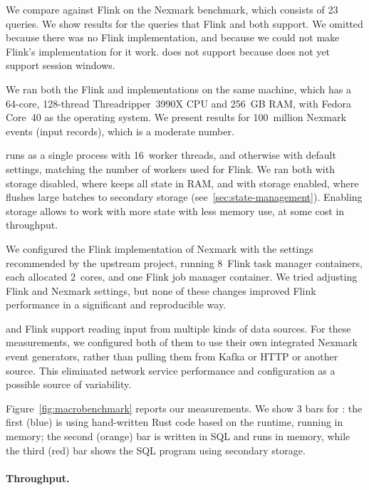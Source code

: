 We compare \dbsp against Flink on the Nexmark benchmark, which
consists of 23 queries.  We show results for the queries that Flink
and \dbsp both support.  We omitted  because there was no
Flink implementation, and  because we could not make
Flink's implementation for it work.  \dbsp does not support
 because \dbsp does not yet support session windows.

We ran both the Flink and \dbsp implementations on the same machine,
which has a 64-core, 128-thread Threadripper~3990X CPU and 256~GB RAM,
with Fedora Core~40 as the operating system. We present results for
100~million Nexmark events (input records), which is a moderate
number.

\dbsp runs as a single process with 16~worker threads, and otherwise
with default settings, matching the number of workers used for Flink.
We ran \dbsp both with storage disabled, where \dbsp keeps all state
in RAM, and with storage enabled, where \dbsp flushes large batches to
secondary storage (see~\ref{sec:state-management}).  Enabling storage
allows \dbsp to work with more state with less memory use, at some
cost in throughput.

We configured the Flink implementation of Nexmark with the settings
recommended by the upstream project, running 8~Flink task manager
containers, each allocated 2~cores, and one Flink job manager
container.  We tried adjusting Flink and Nexmark settings, but none of
these changes improved Flink performance in a significant and
reproducible way.

\dbsp and Flink support reading input from multiple kinds of data
sources.  For these measurements, we configured both of them to use
their own integrated Nexmark event generators, rather than pulling
them from Kafka or HTTP or another source.  This eliminated network
service performance and configuration as a possible source of
variability.

Figure~\ref{fig:macrobenchmark} reports our measurements.  We show 3
bars for \dbsp: the first (blue) is using hand-written Rust code based
on the \dbsp runtime, running in memory; the second (orange) bar is
written in SQL and runs in memory, while the third (red) bar shows the
SQL program using secondary storage.

\paragraph{Throughput.}

\newcommand{\x}{\(\times\)}

